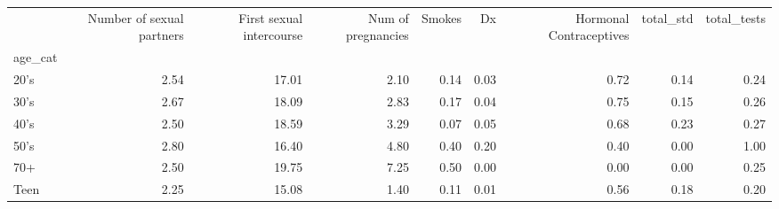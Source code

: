 \begin{tabular}{lrrrrrrrr}
\toprule
{} &  Number of sexual partners &  First sexual intercourse &  Num of pregnancies &  Smokes &    Dx &  Hormonal Contraceptives &  total\_std &  total\_tests \\
age\_cat &                            &                           &                     &         &       &                          &            &              \\
\midrule
20's    &                       2.54 &                     17.01 &                2.10 &    0.14 &  0.03 &                     0.72 &       0.14 &         0.24 \\
30's    &                       2.67 &                     18.09 &                2.83 &    0.17 &  0.04 &                     0.75 &       0.15 &         0.26 \\
40's    &                       2.50 &                     18.59 &                3.29 &    0.07 &  0.05 &                     0.68 &       0.23 &         0.27 \\
50's    &                       2.80 &                     16.40 &                4.80 &    0.40 &  0.20 &                     0.40 &       0.00 &         1.00 \\
70+     &                       2.50 &                     19.75 &                7.25 &    0.50 &  0.00 &                     0.00 &       0.00 &         0.25 \\
Teen    &                       2.25 &                     15.08 &                1.40 &    0.11 &  0.01 &                     0.56 &       0.18 &         0.20 \\
\bottomrule
\end{tabular}
